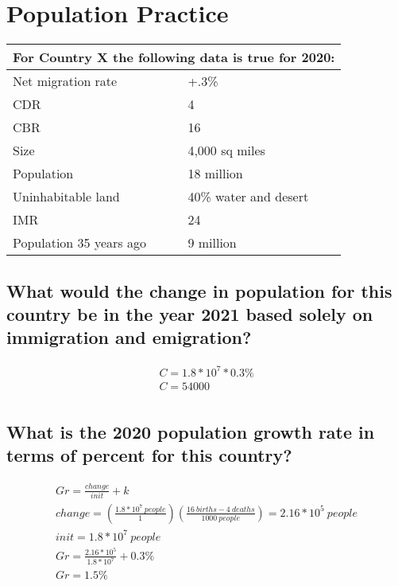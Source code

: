 \documentclass{article}
\begin{document}
\section{Population Practice}

\begin{center}
\begin{tabular}{p{4.5cm}|p{4.5cm}}
    \toprule
    \multicolumn{2}{p{9cm}}{For Country X the following data is true for 2020:} \\
    \midrule
    Net migration rate & +.3\% \\
    CDR & 4 \\
    CBR & 16 \\
    Size & 4,000 sq miles \\
    Population & 18 million \\
    Uninhabitable land & 40\% water and desert \\
    IMR & 24 \\
    Population 35 years ago & 9 million \\
    \bottomrule
\end{tabular}
\end{center}

\subsection{What would the change in population for this country be in the year
2021 based solely on immigration and emigration?}

\begin{gather}
    C = 1.8*10^7 * 0.3\% \\
    C = 54000 \\
\end{gather}

\subsection{What is the 2020 population growth rate in terms of percent for
this country?}

\begin{gather}
    Gr = \frac{change}{init} + k \\
    change = \left(\frac{1.8*10^7 \ people}{1}\right) \left(\frac{16\ births - 4\ deaths}{1000\ people}\right) = 2.16*10^5 \ people \\
    init = 1.8 * 10^7 \ people \\
    Gr = \frac{2.16*10^5}{1.8 * 10^7} + 0.3\% \\
    Gr = 1.5\%
\end{gather}
\end{document}
